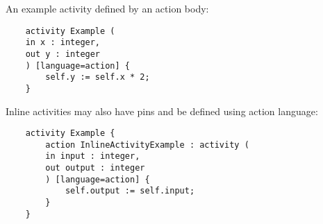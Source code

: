 An example activity defined by an action body:

\begin{lstlisting}
	activity Example (
	in x : integer,
	out y : integer
	) [language=action] {
		self.y := self.x * 2;
	}
\end{lstlisting}

Inline activities may also have pins and be defined using action language:

\begin{lstlisting}
	activity Example {
		action InlineActivityExample : activity (
		in input : integer,
		out output : integer
		) [language=action] {
			self.output := self.input;
		}
	}
\end{lstlisting}